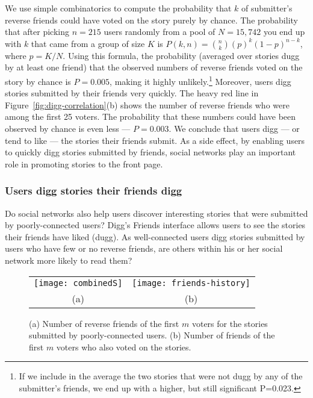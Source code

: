 \documentclass[]{article}
\newcommand{\figref}[1]{Figure~\ref{#1}}
\begin{document}
We use simple combinatorics \cite{Papoulis} to compute the probability that
$k$ of submitter's reverse friends could have voted on the story purely by
chance. The probability that after picking $n=215$ users randomly
from a pool of $N=15,742$ you end up with $k$ that came from a group
of size $K$ is $ P(k,n)={n\choose k} (p)^k (1-p)^{n-k}$, where
$p=K/N$. Using this formula, the probability (averaged over stories
dugg by at least one friend) that the observed numbers of reverse friends
voted on the story by chance is $P=0.005$, making it highly
unlikely.\footnote{If we include in the average the two stories that
were not dugg by any of the submitter's friends, we end up with a
higher, but still significant P=0.023.} Moreover, users digg stories
submitted by their friends very quickly. The heavy red line in
\figref{fig:digg-correlation}(b) shows the number of reverse friends who
were among the first 25 voters. The probability that these numbers
could have been observed by chance is even less --- $P=0.003$. We
conclude that users digg --- or tend to like --- the stories their friends submit.
As a side effect, by enabling users to quickly digg stories
submitted by friends, social networks play an important role in
promoting stories to the front page.


\subsubsection{Users digg stories their friends digg}  Do social networks also help
users discover interesting stories that were submitted by poorly-connected
users? Digg's Friends interface allows users to see the stories their friends have liked (dugg).
As well-connected users digg stories submitted by users who have few or no reverse friends, are others
within his or her social network more likely to read them?

\begin{figure}
\begin{tabular}{cc}
\texttt{[image: combinedS]}  &
  \texttt{[image: friends-history]}\\
  (a) & (b) \\
\end{tabular}
  \caption{(a) Number of reverse friends of the first $m$ voters for the stories submitted by poorly-connected users.
  (b) Number of friends of the first $m$ voters who also voted on the stories.}\label{fig:history-unknown}
\end{figure}
\end{document}

